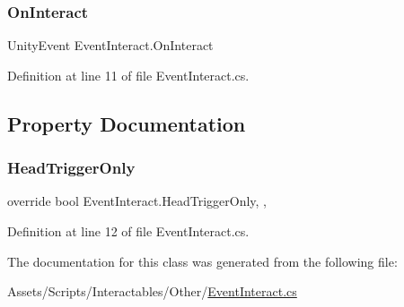 \subsubsection{\texorpdfstring{On\+Interact}{OnInteract}}
{\footnotesize\ttfamily Unity\+Event Event\+Interact.\+On\+Interact}



Definition at line 11 of file Event\+Interact.\+cs.



\subsection{Property Documentation}
\mbox{\label{class_event_interact_a28eeadd71996cf25fa421aa7f124d114}} 
\subsubsection{\texorpdfstring{Head\+Trigger\+Only}{HeadTriggerOnly}}
{\footnotesize\ttfamily override bool Event\+Interact.\+Head\+Trigger\+Only\hspace{0.3cm}{\ttfamily [get]}, {\ttfamily [set]}, {\ttfamily [protected]}}



Definition at line 12 of file Event\+Interact.\+cs.



The documentation for this class was generated from the following file\+:\begin{DoxyCompactItemize}
\item 
Assets/\+Scripts/\+Interactables/\+Other/\mbox{\hyperlink{_event_interact_8cs}{Event\+Interact.\+cs}}\end{DoxyCompactItemize}
